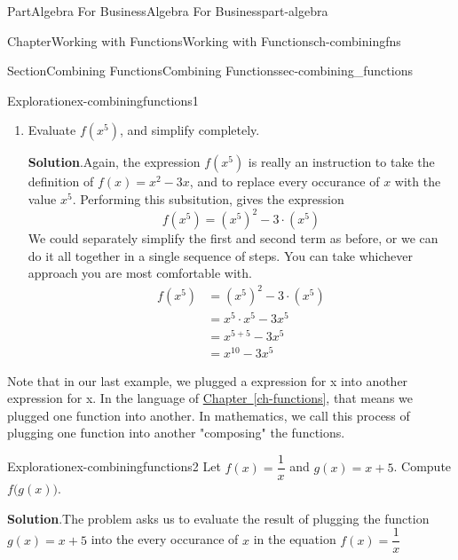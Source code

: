 \documentclass{tufte-book}
\newcommand{\blocktitlefont}{\relax}
\newcommand{\xreffont}{\relax}
\newcommand{\alert}[1]{\textbf{\textit{#1}}}
\numberwithin{equation}{chapter}
\newcommand{\amp}{&}
\begin{document}
\begin{partptx}{Part}{Algebra For Business}{}{Algebra For Business}{}{}{part-algebra}
\begin{chapterptx}{Chapter}{Working with Functions}{}{Working with Functions}{}{}{ch-combiningfns}
\begin{sectionptx}{Section}{Combining Functions}{}{Combining Functions}{}{}{sec-combining_functions}
\begin{exploration}{Exploration}{}{ex-combiningfunctions1}
\begin{enumerate}[font=\bfseries,label=(\alph*),ref=\alph*]
Putting it all together we get%
\begin{align*}
f(5+h)   \amp=  (5+h)^2 - 3\cdot (5+h) \\
\amp= (25+10h+h^2) - (15+3h) \\
\amp= 25 + 10h + h^2 - 15 - 3h \\
\amp= 10 + 7h + h^2 
\end{align*}
\alert{Note:} Whenever substituing an expression into another expression, such as when we substitued the simplifications for \((5+h)^2\) and \(3\cdot (5+h)\) above, you must always include parentheses around each term.  Above, that helped us remember that we needed to distribute the subtraction to \emph{both} terms of \(15+3h\).%
\item{}Evaluate \(f(x^5)\), and simplify completely.%
\par\smallskip%
\noindent\textbf{\blocktitlefont Solution}.\hypertarget{ex-combiningfunctions1-4-2}{}\quad{}Again, the expression \(f(x^5)\) is really an instruction to take the definition of \(f(x) = x^2 - 3x\), and to replace every occurance of \(x\) with the value \(x^5\).  Performing this subsitution, gives the expression%
\begin{equation*}
f(x^5) = (x^5)^2 - 3\cdot (x^5)
\end{equation*}
We could separately simplify the first and second term as before, or we can do it all together in a single sequence of steps.  You can take whichever approach you are most comfortable with.%
\begin{align*}
f(x^5) \amp= (x^5)^2 - 3\cdot (x^5) \\
\amp= x^5 \cdot x^5 - 3 x^5 \\
\amp= x^{5+5} - 3x^5 \\
\amp= x^{10} - 3x^5 
\end{align*}
%
\end{enumerate}%
\end{exploration}%
Note that in our last example, we plugged a expression for x into another expression for x. In the language of \hyperref[ch-functions]{Chapter~{\xreffont\ref{ch-functions}}}, that means we plugged one function into another.  In mathematics, we call this process of plugging one function into another "composing" the functions.%
\begin{exploration}{Exploration}{}{ex-combiningfunctions2}%
Let \(f(x) = \dfrac{1}{x}\) and \(g(x) = x+5\).  Compute \(f\Big(g(x)\Big)\).%
\par\smallskip%
\noindent\textbf{\blocktitlefont Solution}.\hypertarget{ex-combiningfunctions2-2}{}\quad{}The problem asks us to evaluate the result of plugging the  function \(g(x)=x+5\) into the every occurance of \(x\) in the equation \(f(x) = \dfrac{1}{x}\)%

\end{exploration}
\end{sectionptx}
\end{chapterptx}
\end{partptx}
\end{document}
